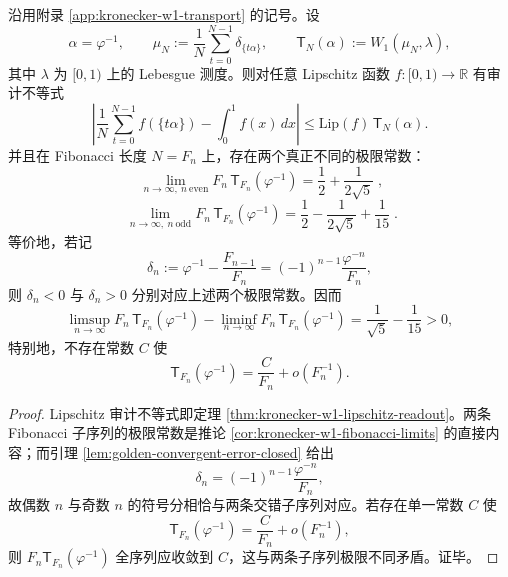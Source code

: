 \begin{theorem}\label{thm:xi-golden-w1-true-two-phase-limit}
沿用附录 \ref{app:kronecker-w1-transport} 的记号。设
\[
\alpha=\varphi^{-1},
\qquad
\mu_N:=\frac1N\sum_{t=0}^{N-1}\delta_{\{t\alpha\}},
\qquad
\mathsf{T}_N(\alpha):=W_1(\mu_N,\lambda),
\]
其中 \(\lambda\) 为 \([0,1)\) 上的 Lebesgue 测度。则对任意 Lipschitz 函数 \(f:[0,1)\to\mathbb R\) 有审计不等式
\[
\left|
\frac1N\sum_{t=0}^{N-1}f(\{t\alpha\})-\int_0^1 f(x)\,dx
\right|
\le
\mathrm{Lip}(f)\,\mathsf{T}_N(\alpha).
\]
并且在 Fibonacci 长度 \(N=F_n\) 上，存在两个真正不同的极限常数：
\[
\boxed{\;
\lim_{n\to\infty,\ n\ \mathrm{even}}
F_n\,\mathsf{T}_{F_n}(\varphi^{-1})
=
\frac12+\frac{1}{2\sqrt5}\;},
\]
\[
\boxed{\;
\lim_{n\to\infty,\ n\ \mathrm{odd}}
F_n\,\mathsf{T}_{F_n}(\varphi^{-1})
=
\frac12-\frac{1}{2\sqrt5}+\frac1{15}\;}.
\]
等价地，若记
\[
\delta_n:=\varphi^{-1}-\frac{F_{n-1}}{F_n}
=(-1)^{n-1}\frac{\varphi^{-n}}{F_n},
\]
则 \(\delta_n<0\) 与 \(\delta_n>0\) 分别对应上述两个极限常数。因而
\[
\limsup_{n\to\infty}F_n\,\mathsf{T}_{F_n}(\varphi^{-1})
-
\liminf_{n\to\infty}F_n\,\mathsf{T}_{F_n}(\varphi^{-1})
=
\frac1{\sqrt5}-\frac1{15}>0,
\]
特别地，不存在常数 \(C\) 使
\[
\mathsf{T}_{F_n}(\varphi^{-1})=\frac{C}{F_n}+o(F_n^{-1}).
\]
\end{theorem}
\begin{proof}
Lipschitz 审计不等式即定理 \ref{thm:kronecker-w1-lipschitz-readout}。两条 Fibonacci 子序列的极限常数是推论 \ref{cor:kronecker-w1-fibonacci-limits} 的直接内容；而引理 \ref{lem:golden-convergent-error-closed} 给出
\[
\delta_n=(-1)^{n-1}\frac{\varphi^{-n}}{F_n},
\]
故偶数 \(n\) 与奇数 \(n\) 的符号分相恰与两条交错子序列对应。若存在单一常数 \(C\) 使
\[
\mathsf{T}_{F_n}(\varphi^{-1})=\frac{C}{F_n}+o(F_n^{-1}),
\]
则 \(F_n\mathsf{T}_{F_n}(\varphi^{-1})\) 全序列应收敛到 \(C\)，这与两条子序列极限不同矛盾。证毕。
\end{proof}

